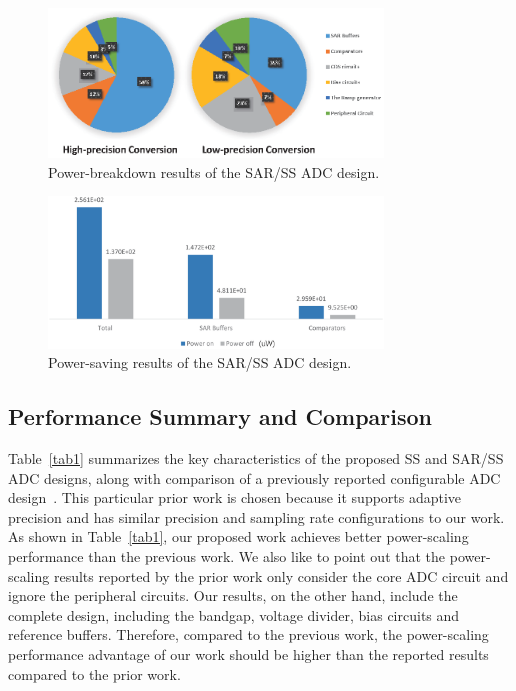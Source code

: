 \begin{figure}[htbp]
	\centerline{\includegraphics[width=3.5in]{./Figures/SARResults1.eps}}
	\caption{Power-breakdown results of the SAR/SS ADC design.}
	\label{SARresults1}
\end{figure} 

\begin{figure}[htbp]
	\centerline{\includegraphics[width=3.5in]{./Figures/SARResults2.eps}}
	\caption{Power-saving results of the SAR/SS ADC design.}
	\label{SARresults2}
\end{figure} 

\subsection{Performance Summary and Comparison}\label{summary}

Table~\ref{tab1} summarizes the key characteristics of the proposed SS and SAR/SS ADC designs,
along with comparison of a previously reported configurable ADC design~\cite{zhu_6--10-bit_2015}. 
This particular prior work is chosen because it supports adaptive precision and has similar precision 
and sampling rate configurations to our work. As shown in Table~\ref{tab1}, our proposed work 
achieves better power-scaling performance than the previous work. We also like to point out that
the power-scaling results reported by the prior work only consider the core ADC circuit
and ignore the peripheral circuits. Our results, on the other hand, include the complete 
design, including the bandgap, voltage divider, bias circuits and reference buffers. Therefore, 
compared to the previous work, the power-scaling performance advantage of our work should
be higher than the reported results compared to the prior work. 

